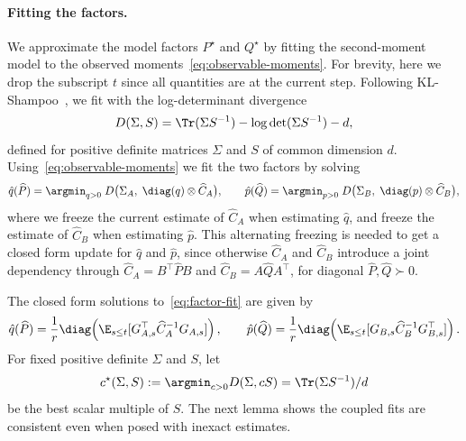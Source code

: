\paragraph{Fitting the factors.} We approximate the model factors $P^\star$
and $Q^\star$ by fitting the second-moment model to the observed
moments~\eqref{eq:observable-moments}. For brevity, here we drop the subscript $t$ since
all quantities are at the current step. Following
KL-Shampoo~\cite{klshampoo}, we fit with the log-determinant
divergence~\cite{logdetdiv}
\[
  D(\Sigma,S)=\Tr(\Sigma S^{-1})-\log\det(\Sigma S^{-1})-d,
\]
defined for positive definite matrices $\Sigma$ and $S$ of common
dimension $d$.
Using~\eqref{eq:observable-moments} we fit the two factors by solving
\begin{equation}\label{eq:factor-fit}
  \hat{q}(\widehat P)
  =\argmin_{q>0}\;
  D\big(\Sigma_A,\; \diag(q) \otimes \widehat C_A\big),
  \qquad
  \hat{p}(\widehat Q)
  =\argmin_{p>0}\;
  D\big(\Sigma_B,\;\diag(p) \otimes \widehat C_B\big),
\end{equation}
where we freeze the current estimate of $\widehat C_A$ when estimating $\hat{q}$, and freeze the estimate of $\widehat C_B$ when estimating $\hat{p}$. This alternating freezing is needed to get a closed form update for $\hat{q}$ and $\hat{p}$, since otherwise $\widehat C_A$ and $\widehat C_B$ introduce a joint dependency through
$\widehat C_A=B^\top\widehat PB$ and
$\widehat C_B=A\widehat QA^\top$, for diagonal
$\widehat P,\widehat Q\succ0$.

The closed form solutions to~\eqref{eq:factor-fit} are given by
\[
  \hat{q}(\widehat P)=\frac1r\diag\!\left(\E_{s \leq t}[G_{A,s}^\top \widehat C_A^{-1}G_{A,s}]\right),
  \qquad
  \hat{p}(\widehat Q)=\frac1r\diag\!\left(\E_{s \leq t}[G_{B,s} \widehat C_B^{-1}G_{B,s}^\top]\right).
\]
For fixed positive definite $\Sigma$ and $S$, let
$$c^\star(\Sigma,S) :=\argmin_{c>0}D(\Sigma,cS)=\Tr(\Sigma S^{-1})/d$$
be the best scalar multiple
of $S$.
The
next lemma shows the coupled fits are consistent even when posed with
inexact estimates.

